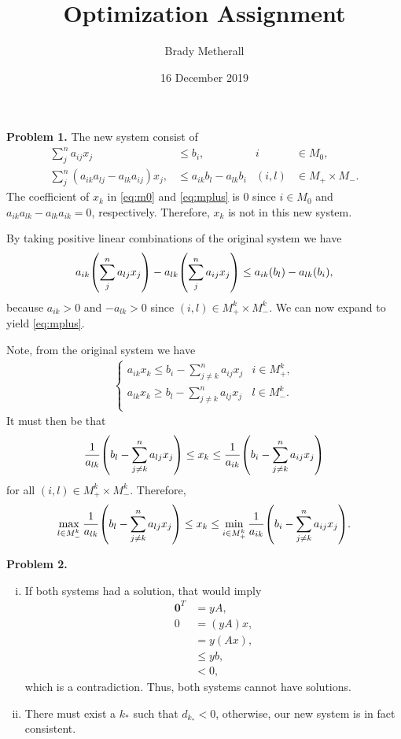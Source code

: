 \documentclass[11pt,a4paper]{article}
\title{Optimization Assignment}
\author{Brady Metherall}
\date{16 December 2019}
\let\originalleft\left
\let\originalright\right
\renewcommand{\left}{\mathopen{}\mathclose\bgroup\originalleft}
\renewcommand{\right}{\aftergroup\egroup\originalright}
\begin{document}
\maketitle


\textbf{Problem 1.}
The new system consist of
\begin{align}
    \sum_j^n a_{ij} x_j &\leq b_i, & i &\in M_0, \label{eq:m0} \\
    \sum_j^n (a_{ik} a_{lj} - a_{lk} a_{ij}) x_j, &\leq a_{ik} b_l - a_{lk} b_i & (i,l) &\in M_+ \times M_-. \label{eq:mplus}
\end{align}
The coefficient of $x_k$ in \eqref{eq:m0} and \eqref{eq:mplus} is 0 since $i \in M_0$ and $a_{ik} a_{lk} - a_{lk} a_{ik} = 0$, respectively. Therefore, $x_k$ is not in this new system.

By taking positive linear combinations of the original system we have
\begin{align}
    a_{ik} \left( \sum_j^n a_{lj} x_j \right) - a_{lk} \left( \sum_j^n a_{ij} x_j \right) \leq a_{ik} \left( b_l \right) - a_{lk} \left( b_i \right),
\end{align}
because $a_{ik} > 0$ and $-a_{lk} > 0$ since $(i, l) \in M_+^k \times M_-^k$. We can now expand to yield \eqref{eq:mplus}.

Note, from the original system we have
\begin{align}
    \begin{cases}
        \displaystyle a_{ik} x_k \leq b_i - \sum_{j \neq k}^n a_{ij} x_j & i \in M_+^k, \\
        \displaystyle a_{lk} x_k \geq b_l - \sum_{j \neq k}^n a_{lj} x_j & l \in M_-^k. \\
    \end{cases}
\end{align}
It must then be that
\begin{align}
    \frac{1}{a_{lk}} \left( b_l - \sum_{j \neq k}^n a_{lj} x_j \right) \leq x_k \leq \frac{1}{a_{ik}} \left( b_i - \sum_{j \neq k}^n a_{ij} x_j \right)
\end{align}
for all $(i, l) \in M_+^k \times M_-^k$. Therefore,
\begin{align}
    \max_{l \in M_-^k} \frac{1}{a_{lk}} \left( b_l - \sum_{j \neq k}^n a_{lj} x_j \right) \leq x_k \leq \min_{i \in M_+^k} \frac{1}{a_{ik}} \left( b_i - \sum_{j \neq k}^n a_{ij} x_j \right).
\end{align}

\textbf{Problem 2.}
\begin{enumerate}[i)]
    \item
    If both systems had a solution, that would imply
    \begin{align*}
        \mathbf{0}^T &= yA, \\
        0 &= (y A) x, \\
        &= y (A x), \\
        &\leq yb, \\
        &< 0,
    \end{align*}
    which is a contradiction. Thus, both systems cannot have solutions.
    \item
    There must exist a $k_*$ such that $d_{k_*} < 0$, otherwise, our new system is in fact consistent.
\end{enumerate}
\end{document}
